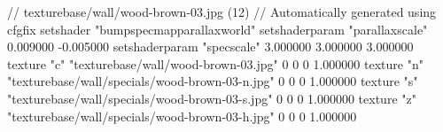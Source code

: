 // texturebase/wall/wood-brown-03.jpg (12)
// Automatically generated using cfgfix
setshader "bumpspecmapparallaxworld"
setshaderparam "parallaxscale" 0.009000 -0.005000
setshaderparam "specscale" 3.000000 3.000000 3.000000
texture "c" "texturebase/wall/wood-brown-03.jpg" 0 0 0 1.000000
texture "n" "texturebase/wall/specials/wood-brown-03-n.jpg" 0 0 0 1.000000
texture "s" "texturebase/wall/specials/wood-brown-03-s.jpg" 0 0 0 1.000000
texture "z" "texturebase/wall/specials/wood-brown-03-h.jpg" 0 0 0 1.000000
